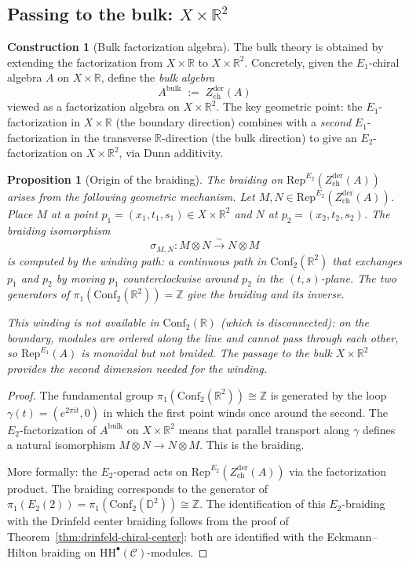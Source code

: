 \documentclass[11pt]{article}
\newtheorem{proposition}[theorem]{Proposition}
\theoremstyle{definition}
\newtheorem{construction}[theorem]{Construction}
\theoremstyle{remark}
\newcommand{\Rep}{\mathrm{Rep}}
\newcommand{\HH}{\mathrm{HH}}
\newcommand{\cC}{\mathcal{C}}
\newcommand{\Zder}{Z^{\mathrm{der}}_{\mathrm{ch}}}
\newcommand{\Conf}{\mathrm{Conf}}
\begin{document}
\subsection{Passing to the bulk: $X \times \mathbb{R}^2$}

\begin{construction}[Bulk factorization algebra]
\label{constr:bulk-fact}
The bulk theory is obtained by extending the factorization from $X \times \mathbb{R}$ to $X \times \mathbb{R}^2$. Concretely, given the $E_1$-chiral algebra $A$ on $X \times \mathbb{R}$, define the \emph{bulk algebra}
\[
 A^{\mathrm{bulk}} \;:=\; \Zder(A)
\]
viewed as a factorization algebra on $X \times \mathbb{R}^2$. The key geometric point: the $E_1$-factorization in $X \times \mathbb{R}$ (the boundary direction) combines with a \emph{second} $E_1$-factorization in the transverse $\mathbb{R}$-direction (the bulk direction) to give an $E_2$-factorization on $X \times \mathbb{R}^2$, via Dunn additivity.
\end{construction}

\begin{proposition}[Origin of the braiding]
\label{prop:braiding-winding}
The braiding on $\Rep^{E_2}(\Zder(A))$ arises from the following geometric mechanism. Let $M, N \in \Rep^{E_2}(\Zder(A))$. Place $M$ at a point $p_1 = (x_1, t_1, s_1) \in X \times \mathbb{R}^2$ and $N$ at $p_2 = (x_2, t_2, s_2)$. The braiding isomorphism
\[
 \sigma_{M,N} \colon M \otimes N \xrightarrow{\sim} N \otimes M
\]
is computed by the \emph{winding path}: a continuous path in $\Conf_2(\mathbb{R}^2)$ that exchanges $p_1$ and $p_2$ by moving $p_1$ counterclockwise around $p_2$ in the $(t,s)$-plane. The two generators of $\pi_1(\Conf_2(\mathbb{R}^2)) = \mathbb{Z}$ give the braiding and its inverse.

This winding is \emph{not} available in $\Conf_2(\mathbb{R})$ (which is disconnected): on the boundary, modules are ordered along the line and cannot pass through each other, so $\Rep^{E_1}(A)$ is monoidal but not braided. The passage to the bulk $X \times \mathbb{R}^2$ provides the second dimension needed for the winding.
\end{proposition}

\begin{proof}
The fundamental group $\pi_1(\Conf_2(\mathbb{R}^2)) \cong \mathbb{Z}$ is generated by the loop $\gamma(t) = (e^{2\pi i t}, 0)$ in which the first point winds once around the second. The $E_2$-factorization of $A^{\mathrm{bulk}}$ on $X \times \mathbb{R}^2$ means that parallel transport along $\gamma$ defines a natural isomorphism $M \otimes N \to N \otimes M$. This is the braiding.

More formally: the $E_2$-operad acts on $\Rep^{E_2}(\Zder(A))$ via the factorization product. The braiding corresponds to the generator of $\pi_1(E_2(2)) = \pi_1(\Conf_2(\mathbb{D}^2)) \cong \mathbb{Z}$. The identification of this $E_2$-braiding with the Drinfeld center braiding follows from the proof of Theorem~\ref{thm:drinfeld-chiral-center}: both are identified with the Eckmann--Hilton braiding on $\HH^\bullet(\cC)$-modules.
\end{proof}
\end{document}
